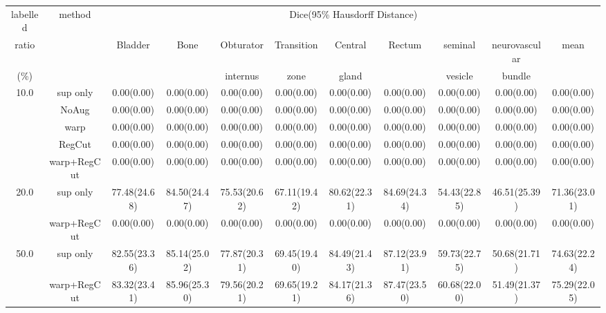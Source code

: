 \begin{table}%
\begin{tabular}{c|c|ccccccccc}%
\hline%
labelled&\multirow{3}{*}{method}&\multicolumn{9}{c}{Dice(95\% Hausdorff Distance)}\\%
ratio&&\multirow{2}{*}{Bladder}&\multirow{2}{*}{Bone}&Obturator&Transition&Central&\multirow{2}{*}{Rectum}&seminal&neurovascular&\multirow{2}{*}{mean}\\%
(\%)&&&&internus&zone&gland&&vesicle&bundle&\\%
\hline%
\multirow{5}{*}{10.0}&sup only&0.00(0.00)&0.00(0.00)&0.00(0.00)&0.00(0.00)&0.00(0.00)&0.00(0.00)&0.00(0.00)&0.00(0.00)&0.00(0.00)\\%
&NoAug&0.00(0.00)&0.00(0.00)&0.00(0.00)&0.00(0.00)&0.00(0.00)&0.00(0.00)&0.00(0.00)&0.00(0.00)&0.00(0.00)\\%
&warp&0.00(0.00)&0.00(0.00)&0.00(0.00)&0.00(0.00)&0.00(0.00)&0.00(0.00)&0.00(0.00)&0.00(0.00)&0.00(0.00)\\%
&RegCut&0.00(0.00)&0.00(0.00)&0.00(0.00)&0.00(0.00)&0.00(0.00)&0.00(0.00)&0.00(0.00)&0.00(0.00)&0.00(0.00)\\%
&warp+RegCut&0.00(0.00)&0.00(0.00)&0.00(0.00)&0.00(0.00)&0.00(0.00)&0.00(0.00)&0.00(0.00)&0.00(0.00)&0.00(0.00)\\%
\hline%
\multirow{2}{*}{20.0}&sup only&77.48(24.68)&84.50(24.47)&75.53(20.62)&67.11(19.42)&80.62(22.31)&84.69(24.34)&54.43(22.85)&46.51(25.39)&71.36(23.01)\\%
&warp+RegCut&0.00(0.00)&0.00(0.00)&0.00(0.00)&0.00(0.00)&0.00(0.00)&0.00(0.00)&0.00(0.00)&0.00(0.00)&0.00(0.00)\\%
\hline%
\multirow{2}{*}{50.0}&sup only&82.55(23.36)&85.14(25.02)&77.87(20.31)&69.45(19.40)&84.49(21.43)&87.12(23.91)&59.73(22.75)&50.68(21.71)&74.63(22.24)\\%
&warp+RegCut&83.32(23.41)&85.96(25.30)&79.56(20.21)&69.65(19.21)&84.17(21.36)&87.47(23.50)&60.68(22.00)&51.49(21.37)&75.29(22.05)\\%
\hline%
\end{tabular}%
\end{table}